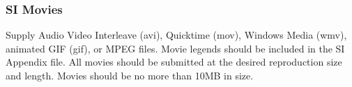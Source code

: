 \documentclass[9pt,twoside]{pnas-new}
\begin{document}
\subsubsection*{SI Movies}

Supply Audio Video Interleave (avi), Quicktime (mov), Windows Media (wmv), animated GIF (gif), or MPEG files. Movie legends should be included in the SI Appendix file. All movies should be submitted at the desired reproduction size and length. Movies should be no more than 10MB in size.




\showacknow %


\end{document}
